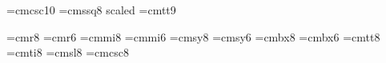 \def\Classvars{\skipmaybe \section{Class variables}}
\def\Section{\medbreak \needindentfalse}
\def\Code{\setupcode \beginCode}
\def\Macro{\setupcode {\bf def }\beginMacro}
\def\Publicvar#1{\subsection{#1}}
\def\Constraint#1{\subsection{#1}}
\def\Action#1{\subsection{#1}}
\def\HCode{\ifinternal \let\next=\relax \else \let\next=\skipHCode \fi \next}
\def\Table#1{\restable{#1}}
\def\endTable{\endrestable}
\def\underline{{\tt\char"5F}}
\def\backslash{{\tt\char"5C}}
\def\tilde{{\tt\char"7E}}
\def\hashmark{\#}
\def\dollar{\char`\$}
\def\percent{\%}
\def\caret{{\tt\char"5E}}
\def\ampersand{\&}
\def\lbrace{{\tt\char`\{}}
\def\rbrace{{\tt\char`\}}}
\def\bar{{\tt\char"7C}}
\let\plainlangle=\langle
\def\langle{\ifmmode\plainlangle\else$\plainlangle$\fi}
\let\plainrangle=\rangle
\def\rangle{\ifmmode\plainrangle\else$\plainrangle$\fi}
\def\type{{\bf type}}
\def\incl{{\bf include}}


\font\sc=cmcsc10
\font\chapterfont=cmssq8 scaled
\font\codefont=cmtt9
\def\sectionfont{\bf}
\def\subsectionfont{\it}

\font\eightrm=cmr8	\font\sixrm=cmr6
\font\eighti=cmmi8	\font\sixi=cmmi6
\font\eightsy=cmsy8	\font\sixsy=cmsy6
\font\eightbf=cmbx8	\font\sixbf=cmbx6
\font\eighttt=cmtt8
\font\eightit=cmti8
\font\eightsl=cmsl8
\font\eightsc=cmcsc8

\def\eightpoint{\def\rm{\fam0\eightrm}%
  \textfont0=\eightrm \scriptfont0=\sixrm \scriptscriptfont0=\fiverm
  \textfont1=\eighti  \scriptfont1=\sixi  \scriptscriptfont1=\fivei
  \textfont2=\eightsy \scriptfont2=\sixsy \scriptscriptfont2=\fivesy
  \textfont3=\tenex   \scriptfont3=\tenex \scriptscriptfont3=\tenex
  \textfont\itfam=\eightit  \def\it{\fam\itfam\eightit}%
  \textfont\slfam=\eightsl  \def\sl{\fam\slfam\eightsl}%
  \textfont\ttfam=\eighttt  \def\tt{\fam\ttfam\eighttt}%
  \textfont\bffam=\eightbf  \scriptfont\bffam=\sixbf
   \scriptscriptfont\bffam=\fivebf  \def\bf{\fam\itfam\eightbf}%
  \normalbaselineskip=9pt
  \setbox\strutbox=\hbox{\vrule height7pt depth2pt width0pt}%
  \def\sc{\fam0\eightsc}%
  \let\big=\eightbig \normalbaselines\rm}


